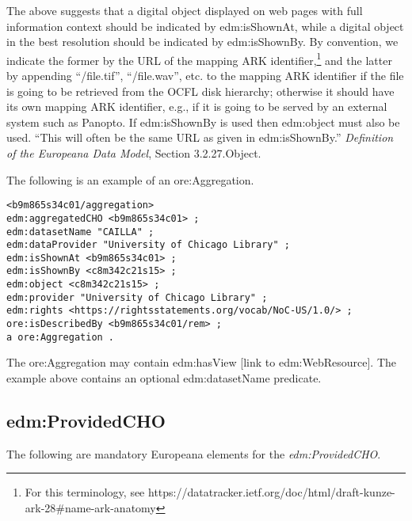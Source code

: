 \documentclass[11pt]{article}
\begin{document}
The above suggests that a digital object displayed on web pages with full information context should be indicated by edm:isShownAt, while a digital object in the best resolution should be indicated by edm:isShownBy. By convention, we indicate the former by the URL of the mapping ARK identifier,\footnote{For this terminology, see https://datatracker.ietf.org/doc/html/draft-kunze-ark-28\#name-ark-anatomy} and the latter by appending ``/file.tif'', ``/file.wav'', etc. to the mapping ARK identifier if the file is going to be retrieved from the OCFL disk hierarchy; otherwise it should have its own mapping ARK identifier, e.g., if it is going to be served by an external system such as Panopto. If edm:isShownBy is used then edm:object must also be used. ``This will often be the same URL as given in edm:isShownBy.'' \textit{Definition of the Europeana Data Model}, Section 3.2.27.Object.


The following is an example of an ore:Aggregation.

\begin{verbatim}
<b9m865s34c01/aggregation>
edm:aggregatedCHO <b9m865s34c01> ;
edm:datasetName "CAILLA" ;
edm:dataProvider "University of Chicago Library" ;
edm:isShownAt <b9m865s34c01> ;
edm:isShownBy <c8m342c21s15> ;
edm:object <c8m342c21s15> ;
edm:provider "University of Chicago Library" ;
edm:rights <https://rightsstatements.org/vocab/NoC-US/1.0/> ;
ore:isDescribedBy <b9m865s34c01/rem> ;
a ore:Aggregation .
\end{verbatim}  

The ore:Aggregation may contain edm:hasView [link to edm:WebResource]. The example above contains an optional edm:datasetName predicate.

\subsection{edm:ProvidedCHO}
The following are mandatory Europeana elements for the \textit{edm:ProvidedCHO}.
\end{document}
